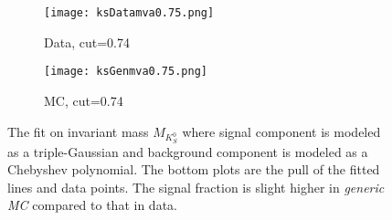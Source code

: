 \begin{figure}[htpb]
	\begin{subfigure}{0.5\linewidth}
		\caption{Data, cut=0.74}
		\texttt{[image: ksDatamva0.75.png]}
	\end{subfigure}
\begin{subfigure}{0.5\linewidth}
	\caption{MC, cut=0.74}
	\texttt{[image: ksGenmva0.75.png]}
\end{subfigure}
\caption{The fit on invariant mass $M_{K_S^0}$ where signal component is modeled as a triple-Gaussian and background component is modeled as a Chebyshev polynomial. The bottom plots are the pull of the fitted lines and data points.  The signal fraction is slight higher in \textit{generic MC} compared to that in data.}
\label{fig:Rfit}
\end{figure}

\begin{comment}
\begin{subfigure}{0.5\linewidth}
\caption{Data,cut=0.9}
\texttt{[image: ksDatamva0.9.png]}
\end{subfigure}
\begin{subfigure}{0.5\linewidth}
\caption{MC,cut=0.9}
\texttt{[image: ksMCmva0.9.png]}
\end{subfigure}
\caption{Invariant mass fit of $K_S^0$ using cut at 0.2(loose) and 0.9(tight) to calculate $S_{data/MC}$.}
\end{figure}
\end{comment}

\begin{comment}
\subsection{Summary}
The development of Belle II $K_S^0$ classifier is enlighten by the experience from Belle. A comprehensive study of training observables from $K_S^0$ decay characteristics has been exploited. It takes the advantage of FastBDT algorithm to achieve a high fake rejection power. As a result, classifier is able to give a output which can be used as a cut to select good $K_S^0$ candidates with high purity. The classifier is validated with real experimental data as well. A primary data validation study of\textit{KsFinder}is conducted with implementing correction on data and MC along with its contribution to $B^0$. The performance of\textit{KsFinder}is in a good shape and no clear bias is found on the yield of the number of $K_S^0$. For the reconstruction of $B^0 \to K_S^0  K_S^0  K_S^0$, the development of\textit{KsFinder}is critical to suppress large fraction of combination background from fake $K_S^0$.
\end{comment}
